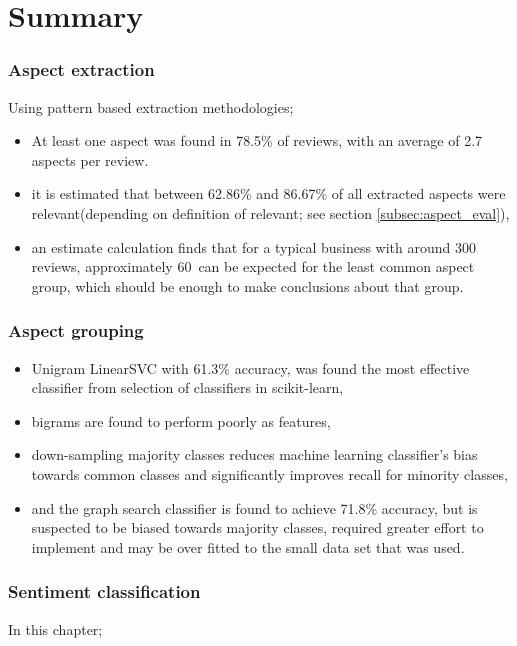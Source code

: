 \documentclass[a4paper,11pt]{kth-mag}
\newcommand{\numValueAspects}{60}
\begin{document}


\chapter{Summary}

\subsection{Aspect extraction}
Using pattern based extraction methodologies;
\begin{itemize}
\item At least one aspect was found in 78.5\% of reviews, with an average of 2.7 aspects per review.

\item it is estimated that between 62.86\% and 86.67\% of all extracted aspects were relevant(depending on definition of relevant; see section \ref{subsec:aspect_eval}),

\item an estimate calculation finds that for a typical business with around 300 reviews,
approximately \numValueAspects~can be expected for the least common aspect group, which should be enough to make conclusions about that group.
\end{itemize}


\subsection{Aspect grouping}
\begin{itemize}
\item Unigram LinearSVC with 61.3\% accuracy, was found the most effective classifier from selection of classifiers in scikit-learn,
\item bigrams are found to perform poorly as features,
\item down-sampling majority classes reduces machine learning classifier's bias towards common classes and
  significantly improves recall for minority classes,
\item and the graph search classifier is found to achieve 71.8\% accuracy, but is suspected to be biased towards
  majority classes, required greater effort to implement and may be over fitted to the small data set that was used.

\end{itemize}


\subsection{Sentiment classification}
In this chapter;
\end{document}

